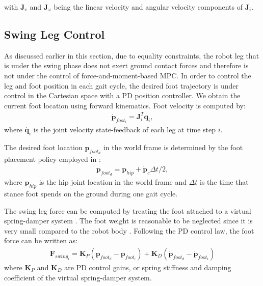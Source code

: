 with $\bm {J}_v $ and $\bm {J}_{\omega} $ being the linear velocity and angular velocity components of $\bm {J}_i $.

\subsection{Swing Leg Control}
As discussed earlier in this section, due to equality constraints, the robot leg that is under the swing phase does not exert ground contact forces and therefore is not under the control of force-and-moment-based MPC. In order to control the leg and foot position in each gait cycle, the desired foot trajectory is under control in the Cartesian space with a PD position controller. 
We obtain the current foot location using forward kinematics. Foot velocity is computed by:
\begin{align}
\label{eq:footVel}
{\dot {\bm p}}_{{foot}_i} =  \bm J_i^T \dot{\bm q_i},
\end{align}
where $\dot{\bm q_i}$ is the joint velocity state-feedback of each leg at time step $i$.

The desired foot location $\bm p_{{foot}_d}$ in the world frame is determined by the foot placement policy employed in \cite{di2018dynamic}:
\begin{align}
\label{eq:footPlacement}
\bm p_{{foot}_d} =  \bm p_{hip} + \dot{\bm p}_c \Delta t/2,
\end{align}
where $\bm p_{hip}$ is the hip joint location in the world frame and $\Delta t$ is the time that stance foot spends on the ground during one gait cycle. 

The swing leg force can be computed by treating the foot attached to a virtual spring-damper system \cite{chen2020virtual}. The foot weight is reasonable to be neglected since it is very small compared to the robot body \cite{nguyen2019optimized}. Following the PD control law, the foot force can be written as: 
\begin{align}
\label{eq:PDswing}
\bm F_{swing_i}=\bm K_P(\bm p_{{foot}_d}-\bm p_{{foot}_i})+\bm K_D(\dot{\bm p}_{{foot}_d}-\dot{\bm p}_{{foot}_i})
\end{align}
where $\bm K_P$ and $\bm K_D$ are PD control gains, or spring stiffness and damping coefficient of the virtual spring-damper system. %

